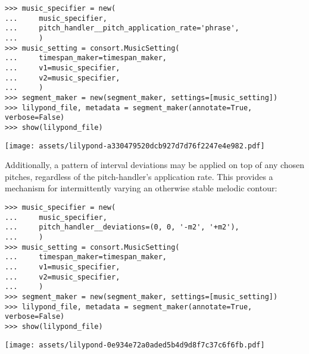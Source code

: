 \begin{abjadbookoutput}
\begin{singlespacing}
\vspace{-0.5\baselineskip}
\begin{verbatim}
>>> music_specifier = new(
...     music_specifier,
...     pitch_handler__pitch_application_rate='phrase',
...     )
>>> music_setting = consort.MusicSetting(
...     timespan_maker=timespan_maker,
...     v1=music_specifier,
...     v2=music_specifier,
...     )
>>> segment_maker = new(segment_maker, settings=[music_setting])
>>> lilypond_file, metadata = segment_maker(annotate=True, verbose=False)
>>> show(lilypond_file)
\end{verbatim}
\noindent\texttt{[image: assets/lilypond-a330479520dcb927d7d76f2247e4e982.pdf]}
\end{singlespacing}
\end{abjadbookoutput}

\noindent Additionally, a pattern of interval deviations may be applied on top
of any chosen pitches, regardless of the pitch-handler's application rate. This
provides a mechanism for intermittently varying an otherwise stable melodic
contour:

\begin{comment}
<abjad>[stylesheet=../consort.ily]
music_specifier = new(
    music_specifier,
    pitch_handler__deviations=(0, 0, '-m2', '+m2'),
    )
music_setting = consort.MusicSetting(
    timespan_maker=timespan_maker,
    v1=music_specifier,
    v2=music_specifier,
    )
segment_maker = new(segment_maker, settings=[music_setting])
lilypond_file, metadata = segment_maker(annotate=True, verbose=False)
show(lilypond_file)
</abjad>
\end{comment}

\begin{abjadbookoutput}
\begin{singlespacing}
\vspace{-0.5\baselineskip}
\begin{verbatim}
>>> music_specifier = new(
...     music_specifier,
...     pitch_handler__deviations=(0, 0, '-m2', '+m2'),
...     )
>>> music_setting = consort.MusicSetting(
...     timespan_maker=timespan_maker,
...     v1=music_specifier,
...     v2=music_specifier,
...     )
>>> segment_maker = new(segment_maker, settings=[music_setting])
>>> lilypond_file, metadata = segment_maker(annotate=True, verbose=False)
>>> show(lilypond_file)
\end{verbatim}
\noindent\texttt{[image: assets/lilypond-0e934e72a0aded5b4d9d8f7c37c6f6fb.pdf]}
\end{singlespacing}
\end{abjadbookoutput}


